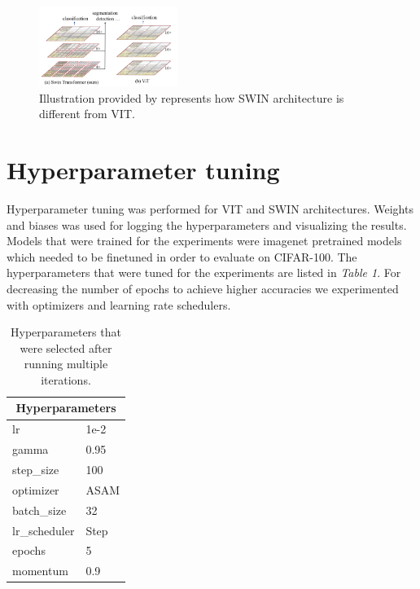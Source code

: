 \documentclass{article}
\begin{document}
\begin{figure}[ht]
    \vskip 0.2in
    \centering
    \includegraphics[width=0.4\textwidth]{swin.png}
    \caption{Illustration provided by \cite{DBLP:journals/corr/abs-2103-14030} represents how SWIN architecture is different from VIT.}
    \label{fig:foobar}
    \vskip -0.2in
\end{figure}

\section{Hyperparameter tuning}
Hyperparameter tuning was performed for VIT and SWIN architectures.
Weights and biases \cite{wandb} was used for logging the hyperparameters and visualizing the results.
Models that were trained for the experiments were imagenet pretrained models which needed to be finetuned in order to evaluate on CIFAR-100.
The hyperparameters that were tuned for the experiments are listed in \textit{Table 1}.
For decreasing the number of epochs to achieve higher accuracies we experimented with optimizers and learning rate schedulers.

\begin{table}[ht]
    \centering
    \begin{tabular}{|l|l|}
        \hline
        \multicolumn{2}{|c|}{\textbf{Hyperparameters}} \\ \hline
        lr            & 1e-2                           \\ \hline
        gamma         & 0.95                           \\ \hline
        step\_size    & 100                            \\ \hline
        optimizer     & ASAM                           \\ \hline
        batch\_size   & 32                             \\ \hline
        lr\_scheduler & Step                           \\ \hline
        epochs        & 5                              \\ \hline
        momentum      & 0.9
        \\ \hline
    \end{tabular}
    \caption{Hyperparameters that were selected after running multiple iterations.}
    \label{tab:actor_critic_hp}
\end{table}
\end{document}
